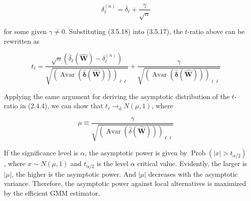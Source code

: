 \documentclass[10pt]{article}
\begin{document}
\begin{equation*}
\delta_{\ell}^{(n)}=\bar{\delta}_{\ell}+\frac{\gamma}{\sqrt{n}} \tag{3.5.18}
\end{equation*}


for some given $\gamma \neq 0$. Substituting (3.5.18) into (3.5.17), the $t$-ratio above can be rewritten as


\begin{equation*}
t_{\ell}=\frac{\sqrt{n}\left(\hat{\delta}_{\ell}(\widehat{\mathbf{W}})-\delta_{\ell}^{(n)}\right)}{\sqrt{(\operatorname{Avar}(\widehat{\boldsymbol{\delta}}(\widehat{\mathbf{W}})))_{\ell \ell}}}+\frac{\gamma}{\sqrt{(\operatorname{Avar}(\hat{\boldsymbol{\delta}}(\widehat{\mathbf{W}})))_{\ell \ell}}} \tag{3.5.19}
\end{equation*}


Applying the same argument for deriving the asymptotic distribution of the $t$-ratio in (2.4.4), we can show that $t_{\ell} \rightarrow_{\mathrm{d}} N(\mu, 1)$, where


\begin{equation*}
\mu \equiv \frac{\gamma}{\sqrt{(\operatorname{Avar}(\hat{\delta}(\widehat{\mathbf{W}})))_{\ell \ell}}} \tag{3.5.20}
\end{equation*}


If the significance level is $\alpha$, the asymptotic power is given by $\operatorname{Prob}\left(|x|>t_{\alpha / 2}\right)$, where $x \sim N(\mu, 1)$ and $t_{\alpha / 2}$ is the level $\alpha$ critical value. Evidently, the larger is $|\mu|$, the higher is the asymptotic power. And $|\mu|$ decreases with the asymptotic variance. Therefore, the asymptotic power against local alternatives is maximized by the efficient GMM estimator.
\end{document}
